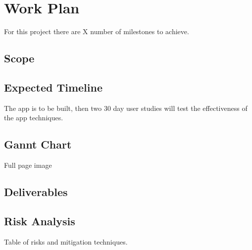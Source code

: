 
\newpage
\section{Work Plan}

For this project there are X number of milestones to achieve.


\subsection*{Scope}

\subsection*{Expected Timeline}

The app is to be built, then two 30 day user studies will test the effectiveness of the app techniques.




\subsection*{Gannt Chart}

Full page image

\subsection*{Deliverables}


\subsection{Risk Analysis}

Table of risks and mitigation techniques.